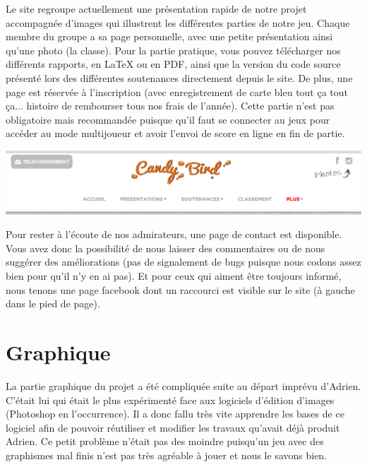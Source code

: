 \documentclass [11pt]{report}
\begin{document}
	Le site regroupe actuellement une présentation rapide de notre projet accompagnée d'images qui illustrent les différentes parties de notre jeu. Chaque membre du groupe a sa page personnelle, avec une petite présentation ainsi qu'une photo (la classe). Pour la partie pratique, vous pouvez télécharger nos différents rapports, en LaTeX ou en PDF, ainsi que la version du code source présenté lors des différentes soutenances directement depuis le site. De plus, une page est réservée à l'inscription (avec enregistrement de carte bleu tout ça tout ça... histoire de rembourser tous nos frais de l'année). Cette partie n'est pas obligatoire mais recommandée puisque qu'il faut se connecter au jeux pour accéder au mode multijoueur et avoir l'envoi de score en ligne en fin de partie.\\
	\vspace{4mm}
	
	\begin{center}
	\includegraphics[scale=0.5]{images/site.png}
	\end{center}
	
	\vspace{10mm}
	
	Pour rester à l'écoute de nos admirateurs, une page de contact est disponible. Vous avez donc la possibilité de nous laisser des commentaires ou de nous suggérer des améliorations (pas de signalement de bugs puisque nous codons assez bien pour qu'il n'y en ai pas). Et pour ceux qui aiment être toujours informé, nous tenons une page facebook dont un raccourci est visible sur le site (à gauche dans le pied de page).
	
	\vspace{10mm}
	
	\newpage
	
	\section{Graphique}
	La partie graphique du projet a été compliquée suite au départ imprévu d'Adrien. C'était lui qui était le plus expérimenté face aux logiciels d'édition d'images (Photoshop en l'occurrence). Il a donc fallu  très vite apprendre les bases de ce logiciel afin de pouvoir réutiliser et modifier les travaux qu'avait déjà produit Adrien. Ce petit problème n'était pas des moindre puisqu'un jeu avec des graphismes mal finis n'est pas très agréable à jouer et nous le savons bien.
	
\end{document}
